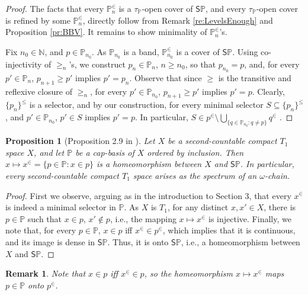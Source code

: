 \documentclass[12pt]{amsart}
\theoremstyle{plain}
\newtheorem{remark}[theorem]{\bf Remark}
\newtheorem{proposition}[theorem]{\bf Proposition}
\newcommand \Sp{{\mathsf{S}}}
\newcommand \NN{\mathbb{N}}
\newcommand \PPb{\mathbb{P}}
\begin{document}
\begin{proof}
The facts that  every $\PPb_n^\in$ is a $\tau_\PPb$-open cover of $\Sp \PPb$, and every $\tau_\PPb$-open cover is refined by some $\PPb_n^\in$, directly follow from Remark \ref{re:LevelsEnough} and Proposition \ref{pr:BBV}. It remains to show minimality of  $\PPb_n^\in$'s.

Fix $n_0 \in \NN$, and $p \in \PPb_{n_0}$. As $\PPb_{n_0}$ is a band, $\PPb^\in_{n_0}$ is a cover of $\Sp \PPb$.  Using co-injectivity of $\geq_n$'s, we construct $p_n	\in \PPb_{n}$, $n \geq n_0$, so that $p_{n_0}=p$, and, for every $p' \in \PPb_{n}$, $p_{n+1} \geq p'$ implies $p'=p_n$. Observe that since $\geq$ is the transitive and reflexive closure of $\geq_n$, for every $p' \in \PPb_{n_0}$, $p_{n+1} \geq p'$ implies $p'=p$. Clearly, $\{p_n\}^\leq$ is a selector, and by our construction, for every minimal selector $S \subseteq \{p_n\}^\leq$, and $p' \in \PPb_{n_0}$, $p' \in S$ implies $p'=p$. In particular, $S \in p^\in \setminus \bigcup_{ \{q \in \PPb_{n_0}:q \neq p\} } q^\in$ .
\end{proof}
	
	
\begin{proposition}[Proposition 2.9 in \cite{BaBiVi}]
\label{pr:HomeoSpectrum}
Let $X$ be a second-countable compact $T_1$ space $X$, and let $\PPb$ be a cap-basis of $X$ ordered by inclusion. Then $x \mapsto x^\in=\{p \in \PPb: x \in p \}$ is a homeomorphism between $X$ and $\Sp \PPb$. In particular, every second-countable compact $T_1$ space arises as the spectrum of an $\omega$-chain.
\end{proposition}

\begin{proof}
First we observe, arguing as in the introduction to Section 3, that every $x^\in$ is indeed a minimal selector in $\PPb$. As $X$ is $T_1$, for any distinct $x, x' \in X$, there is $p \in \PPb$ such that $x \in p$, $x' \not \in p$, i.e., the mapping $x \mapsto x^\in$ is injective. Finally, we note that, for every $p \in \PPb$, $x \in p $ iff $x^\in \in p^\in$, which implies that it is continuous, and its image is dense in $\Sp \PPb$. Thus, it is onto $\Sp \PPb$, i.e., a homeomorphism between $X$ and $\Sp \PPb$. 
\end{proof}

\begin{remark}
\label{re:pGoesTop^in}
Note that $x \in p$ iff $x^\in \in p$, so the homeomorphism $x \mapsto x^\in$ maps $p \in \PPb$ onto $p^\in$.
\end{remark}
\end{document}
